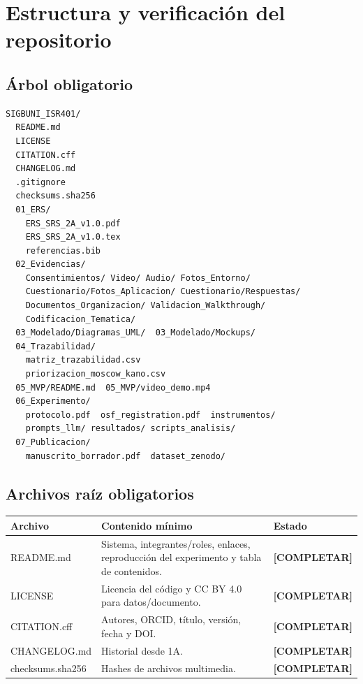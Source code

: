 \documentclass[12pt,journal,onecolumn]{IEEEtran}
\newcommand{\completar}{\textcolor{red!70!black}{\textbf{[COMPLETAR]}}}
\begin{document}
\section{Estructura y verificación del repositorio}
\subsection{Árbol obligatorio}
\begin{Verbatim}[fontsize=\small]
SIGBUNI_ISR401/
  README.md
  LICENSE
  CITATION.cff
  CHANGELOG.md
  .gitignore
  checksums.sha256
  01_ERS/
    ERS_SRS_2A_v1.0.pdf
    ERS_SRS_2A_v1.0.tex
    referencias.bib
  02_Evidencias/
    Consentimientos/ Video/ Audio/ Fotos_Entorno/
    Cuestionario/Fotos_Aplicacion/ Cuestionario/Respuestas/
    Documentos_Organizacion/ Validacion_Walkthrough/
    Codificacion_Tematica/
  03_Modelado/Diagramas_UML/  03_Modelado/Mockups/
  04_Trazabilidad/
    matriz_trazabilidad.csv
    priorizacion_moscow_kano.csv
  05_MVP/README.md  05_MVP/video_demo.mp4
  06_Experimento/
    protocolo.pdf  osf_registration.pdf  instrumentos/
    prompts_llm/ resultados/ scripts_analisis/
  07_Publicacion/
    manuscrito_borrador.pdf  dataset_zenodo/
\end{Verbatim}

\subsection{Archivos raíz obligatorios}
\begin{tabularx}{\textwidth}{P{0.22\textwidth}Y P{0.14\textwidth}}\toprule
\textbf{Archivo} & \textbf{Contenido mínimo} & \textbf{Estado}\\\midrule
README.md & Sistema, integrantes/roles, enlaces, reproducción del experimento y tabla de contenidos. & \completar\\
LICENSE & Licencia del código y CC BY 4.0 para datos/documento. & \completar\\
CITATION.cff & Autores, ORCID, título, versión, fecha y DOI. & \completar\\
CHANGELOG.md & Historial desde 1A. & \completar\\
checksums.sha256 & Hashes de archivos multimedia. & \completar\\\bottomrule
\end{tabularx}
\end{document}
